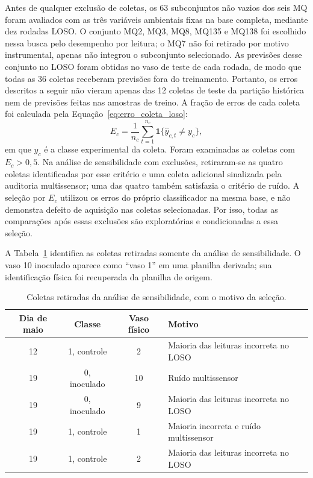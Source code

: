 Antes de qualquer exclusão de coletas, os 63 subconjuntos não vazios dos
seis MQ foram avaliados com as três variáveis ambientais fixas na base
completa, mediante dez rodadas LOSO. O conjunto MQ2, MQ3, MQ8, MQ135 e
MQ138 foi escolhido nessa busca pelo desempenho por leitura; o MQ7 não
foi retirado por motivo instrumental, apenas não integrou o subconjunto
selecionado. As previsões desse conjunto no LOSO foram obtidas no vaso
de teste de cada rodada, de modo que todas as 36 coletas receberam
previsões fora do treinamento. Portanto, os erros descritos a seguir
não vieram apenas das 12 coletas de teste da partição histórica nem de
previsões feitas nas amostras de treino. A fração de erros de cada coleta
foi calculada pela
Equação~\eqref{eq:erro_coleta_loso}:
\begin{equation}
    E_c=\frac{1}{n_c}\sum_{t=1}^{n_c}
    \mathbf{1}\{\widehat y_{c,t}\neq y_c\},
    \label{eq:erro_coleta_loso}
\end{equation}
em que $y_c$ é a classe experimental da coleta. Foram examinadas as
coletas com $E_c>0{,}5$. Na análise de sensibilidade com exclusões,
retiraram-se as quatro coletas identificadas por esse critério e uma
coleta adicional sinalizada pela auditoria multissensor; uma das quatro
também satisfazia o critério de ruído. A seleção por $E_c$ utilizou os
erros do próprio classificador na mesma base, e não demonstra defeito de
aquisição nas coletas selecionadas. Por isso, todas as comparações após
essas exclusões são exploratórias e condicionadas a essa seleção.

A Tabela~\ref{tab:coletas_excluidas_sensibilidade} identifica as coletas
retiradas somente da análise de sensibilidade. O vaso 10 inoculado aparece
como ``vaso 1'' em uma planilha derivada; sua identificação física foi
recuperada da planilha de origem.
\begin{table}[H]
    \centering
    \footnotesize
    \caption{Coletas retiradas da análise de sensibilidade, com o motivo da seleção.}
    \label{tab:coletas_excluidas_sensibilidade}
    \begin{tabular}{cccp{}}
        \hline
        Dia de maio & Classe & Vaso físico & Motivo \\
        \hline
        12 & 1, controle & 2 & Maioria das leituras incorreta no LOSO \\
        19 & 0, inoculado & 10 & Ruído multissensor \\
        19 & 0, inoculado & 9 & Maioria das leituras incorreta no LOSO \\
        19 & 1, controle & 1 & Maioria incorreta e ruído multissensor \\
        19 & 1, controle & 2 & Maioria das leituras incorreta no LOSO \\
        \hline
    \end{tabular}
\end{table}

